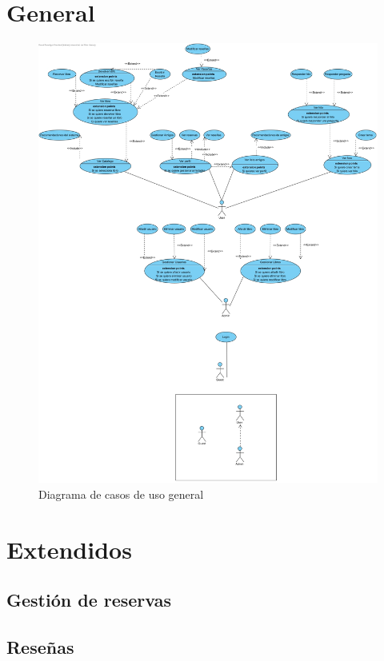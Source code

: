 \documentclass{report}
\begin{document}
        \section{General}
            \begin{figure}[H]
                \centering
                \includegraphics[scale=0.18]{img/casos_uso/General.jpg}
                \caption{Diagrama de casos de uso general}
            \end{figure}
        \clearpage
        \section{Extendidos}
        \subsection{Gestión de reservas}
        \clearpage
        \subsection{Reseñas}
        \clearpage
\end{document}
